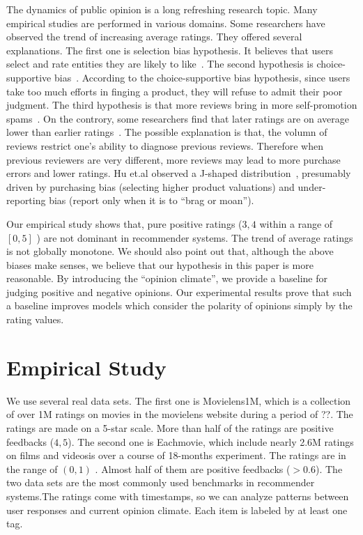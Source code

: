 \documentclass{sig-alternate}
\begin{document}
The dynamics of public opinion is a long refreshing research topic. Many empirical studies are performed in various domains. Some researchers have observed the trend of increasing average ratings. They offered several explanations. The first one is selection bias hypothesis. It believes that  users select and rate entities they are likely to like~\cite{Dalvi2013Para}. The second hypothesis is choice-supportive bias~\cite{Cohen1970dissonance}. According to the choice-supportive bias hypothesis, since users take too much efforts in finging a product, they will refuse to admit their poor judgment. The third hypothesis is that more reviews bring in more self-promotion spams~\cite{Jindal2008Opinion}. On the controry, some researchers find that later ratings are on average lower than earlier ratings~\cite{Godes2012Sequential}. The possible explanation is that, the volumn of reviews restrict one's ability to diagnose previous reviews. Therefore when previous reviewers are very different, more reviews may  lead to more purchase errors and lower ratings. Hu et.al observed a J-shaped distribution~\cite{Hu2009Overcoming}, presumably driven by purchasing bias (selecting higher product valuations) and under-reporting bias (report only when it is to ``brag or moan'').

Our empirical study shows that, pure positive ratings ($3,4$ within a range of $[0,5]$ ) are not dominant in recommender systems. The trend of average ratings is not globally monotone. We should also point out that, although the above biases make senses, we believe that our hypothesis in this paper is more reasonable. By introducing the ``opinion climate'', we provide a baseline for judging positive and negative opinions. Our experimental results prove that such a baseline  improves models which consider the polarity of opinions simply by the rating values.



\section{Empirical Study}\label{sec:empirical}
We use several real data sets. The first one is Movielens1M, which is a collection of over 1M ratings on movies in the movielens website during a period of ??. The ratings are made on a 5-star scale. More than half of the ratings are positive feedbacks ($4,5$).  The second one is Eachmovie, which include nearly 2.6M ratings on films and videosis over a course of 18-months experiment. The  ratings are in the range of $(0,1)$ . Almost half of them are positive feedbacks ($>0.6$). The two data sets are the most commonly used benchmarks in recommender systems.The ratings come with timestamps, so we can analyze patterns between user responses and current opinion climate. Each item is labeled by at least one tag.
\end{document}
